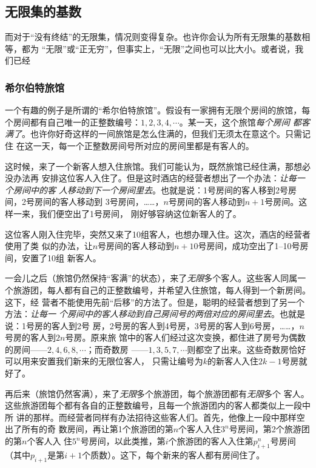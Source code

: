 \subsection{无限集的基数}

而对于“没有终结”的无限集，情况则变得复杂。也许你会认为所有无限集的基数相等，都为
“无限”或“正无穷”，但事实上，“无限”之间也可以比大小。或者说，我们已经

\subsubsection{希尔伯特旅馆}

一个有趣的例子是所谓的“希尔伯特旅馆”。假设有一家拥有无限个房间的旅馆，每
个房间都有自己唯一的正整数编号：$1,2,3,4,\cdots $。某一天，这个旅馆\emph{每个房间
都客满了}。也许你好奇这样的一间旅馆是怎么住满的，但我们无须太在意这个。只需记住
在这一天，每一个正整数房间号所对应的房间里都是有客人的。

这时候，来了一个新客人想入住旅馆。我们可能认为，既然旅馆已经住满，那想必没办法再
安排这位客人入住了。但是这时酒店的经营者想出了一个办法：\emph{让每一个房间中的客
人移动到下一个房间里去}。也就是说：1号房间的客人移到2号房间，2号房间的客人移动到
3号房间，……，$n$号房间的客人移动到$n+1$号房间。这样一来，我们便空出了1号房间，
刚好够容纳这位新客人的了。

这位客人刚入住完毕，突然又来了10组客人，也想办理入住。这次，酒店的经营者使用了类
似的办法，让$n$号房间的客人移动到$n+10$号房间，成功空出了1--10号房间，安置了10组
新客人。

一会儿之后（旅馆仍然保持“客满”的状态），来了\emph{无限}多个客人。这些客人同属一
个旅游团，每人都有自己的正整数编号，并希望入住旅馆，每人得到一个新房间。这下，经
营者不能使用先前“后移”的方法了。但是，聪明的经营者想到了另一个方法：\emph{让每一
个房间中的客人移动到自己房间号的两倍对应的房间里去}。也就是说：1号房的客人到2号
房，2号房的客人到4号房，3号房的客人到6号房，……，$n$号房的客人到$2n$号房。原来旅
馆中的客人们经过这次变换，都住进了房号为偶数的房间——$2,4,6,8,\cdots $；而奇数房
——$1,3,5,7,\cdots $则都空了出来。这些奇数房恰好可以用来安置我们新来的无限位客人，
只需让编号为$k$的新客人入住$2k-1$号房就好了。

再后来（旅馆仍然客满），来了\emph{无限}多个旅游团，每个旅游团都有\emph{无限}多个
客人。这些旅游团每个都有各自的正整数编号，且每一个旅游团内的客人都类似上一段中所
讲的那样。而经营者同样有办法招待这些客人们。首先，他像上一段中那样空出了所有的奇
数房间，再让第1个旅游团的第$n$个客人入住$3^n$号房间，第2个旅游团的第$n$个客人入
住$5^n$号房间，以此类推，第$i$个旅游团的客人入住第$p_{i+1}^n$号房间（其中$p_{i+1}
$是第$i+1$个质数）。这下，每个新来的客人都有房间住了。

